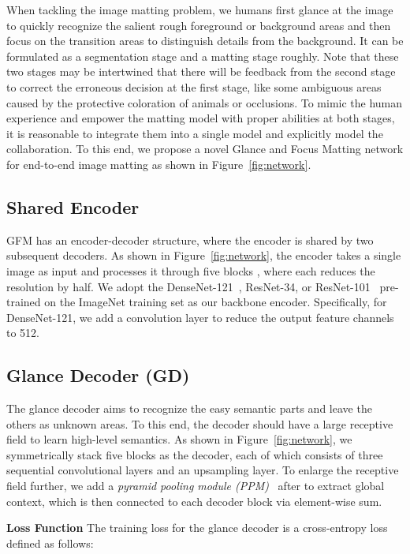 \documentclass[twocolumn]{svjour3}
\begin{document}
When tackling the image matting problem, we humans first glance at the image to quickly recognize the salient rough foreground or background areas and then focus on the transition areas to distinguish details from the background. It can be formulated as a segmentation stage and a matting stage roughly. Note that these two stages may be intertwined that there will be feedback from the second stage to correct the erroneous decision at the first stage, like some ambiguous areas caused by the protective coloration of animals or occlusions. To mimic the human experience and empower the matting model with proper abilities at both stages, it is reasonable to integrate them into a single model and explicitly model the collaboration. To this end, we propose a novel Glance and Focus Matting network for end-to-end image matting as shown in Figure~\ref{fig:network}.

\subsection{Shared Encoder}
GFM has an encoder-decoder structure, where the encoder is shared by two subsequent decoders. As shown in Figure~\ref{fig:network}, the encoder takes a single image as input and processes it through five blocks , where each reduces the resolution by half. We adopt the DenseNet-121~\citep{huang2017densely}, ResNet-34, or ResNet-101~\citep{he2016deep} pre-trained on the ImageNet training set as our backbone encoder. Specifically, for DenseNet-121, we add a convolution layer to reduce the output feature channels to 512.

\subsection{Glance Decoder (GD)}
The glance decoder aims to recognize the easy semantic parts and leave the others as unknown areas. To this end, the decoder should have a large receptive field to learn high-level semantics. As shown in Figure~\ref{fig:network}, we symmetrically stack five blocks  as the decoder, each of which consists of three sequential  convolutional layers and an upsampling layer. To enlarge the receptive field further, we add a \textit{pyramid pooling module (PPM)}~\citep{zhao2017pyramid,Liu2019PoolSal} after  to extract global context, which is then connected to each decoder block  via element-wise sum. 

\textbf{Loss Function} The training loss for the glance decoder is a cross-entropy loss  defined as follows:
\end{document}
